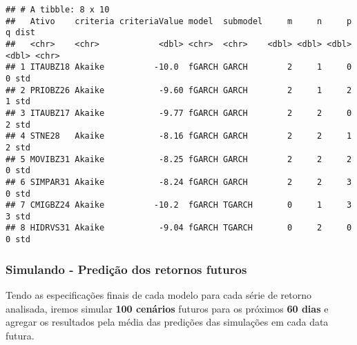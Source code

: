 \documentclass[
]{article}
\begin{document}
\begin{verbatim}
## # A tibble: 8 x 10
##   Ativo    criteria criteriaValue model  submodel     m     n     p     q dist 
##   <chr>    <chr>            <dbl> <chr>  <chr>    <dbl> <dbl> <dbl> <dbl> <chr>
## 1 ITAUBZ18 Akaike          -10.0  fGARCH GARCH        2     1     0     0 std  
## 2 PRIOBZ26 Akaike           -9.60 fGARCH GARCH        2     1     2     1 std  
## 3 ITAUBZ17 Akaike           -9.77 fGARCH GARCH        2     2     0     2 std  
## 4 STNE28   Akaike           -8.16 fGARCH GARCH        2     2     1     2 std  
## 5 MOVIBZ31 Akaike           -8.25 fGARCH GARCH        2     2     2     0 std  
## 6 SIMPAR31 Akaike           -8.24 fGARCH GARCH        2     2     3     0 std  
## 7 CMIGBZ24 Akaike          -10.2  fGARCH TGARCH       0     1     3     3 std  
## 8 HIDRVS31 Akaike           -9.04 fGARCH TGARCH       0     2     0     0 std
\end{verbatim}

\hypertarget{simulando---prediuxe7uxe3o-dos-retornos-futuros}{%
\subsubsection{Simulando - Predição dos retornos
futuros}\label{simulando---prediuxe7uxe3o-dos-retornos-futuros}}

Tendo as especificações finais de cada modelo para cada série de retorno
analisada, iremos simular \textbf{100 cenários} futuros para os próximos
\textbf{60 dias} e agregar os resultados pela média das predições das
simulações em cada data futura.
\end{document}
